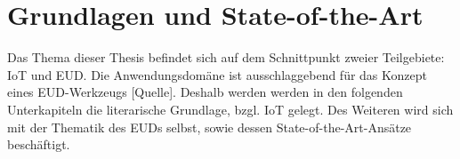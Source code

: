 \chapter{Grundlagen und State-of-the-Art}\label{GrundlagenSOTA}
Das Thema dieser Thesis befindet sich auf dem Schnittpunkt zweier Teilgebiete: \ac{IoT} und \ac{EUD}. Die Anwendungsdomäne ist ausschlaggebend für das Konzept eines \ac{EUD}-Werkzeugs [Quelle]. Deshalb werden werden in den folgenden Unterkapiteln die literarische Grundlage, bzgl. \ac{IoT} gelegt. Des Weiteren wird sich mit der Thematik des \acp{EUD} selbst, sowie dessen State-of-the-Art-Ansätze beschäftigt.







